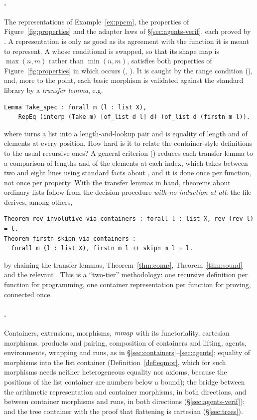 \documentclass{fundam}
\begin{document}
\paragraph{.}  The representations of Example~\ref{ex:ppcm}, the
properties of Figure~\ref{fig:properties} and the adapter laws of
\S\ref{sec:agents-verif}, each proved by .  A
representation is only as good as its agreement with the function it is meant to
represent.  A  whose conditional is swapped, so that its shape map is
$\max(n,m)$ rather than $\min(n,m)$, satisfies both properties of
Figure~\ref{fig:properties} in which  occurs (,
).  It is caught by the range condition
(), and, more to the point, each basic morphism is
validated against the standard library by a \emph{transfer lemma}, e.g.
\begin{lstlisting}
Lemma Take_spec : forall m (l : list X),
    RepEq (interp (Take m) [of_list d l] d) (of_list d (firstn m l)).
\end{lstlisting}
where  turns a list into a length-and-lookup pair and  is equality
of length and of elements at every position.  How hard is it to relate the container-style
definitions to the usual recursive ones?  A general criterion () reduces each
transfer lemma to a comparison of lengths and of the elements at each index, which takes
between two and eight lines using standard facts about , and it is done once per
function, not once per property.  With the transfer lemmas in hand, theorems about
ordinary lists follow from the decision procedure \emph{with no induction at all}: the
file derives, among others,
\begin{lstlisting}
Theorem rev_involutive_via_containers : forall l : list X, rev (rev l) = l.
Theorem firstn_skipn_via_containers :
  forall m (l : list X), firstn m l ++ skipn m l = l.
\end{lstlisting}
by chaining the transfer lemmas, Theorem~\ref{thm:comp}, Theorem~\ref{thm:sound} and the
relevant .  This is a ``two-tier'' methodology: one recursive definition per
function for programming, one container representation per function for proving,
connected once.

\paragraph{.}  Containers, extensions, morphisms, $\mathit{mmap}$ with its
functoriality, cartesian morphisms, products and pairing, composition of containers and
lifting, agents, environments, wrapping and runs, as in
\S\ref{sec:containers}--\ref{sec:agents}; equality of morphisms into the list container
(Definition~\ref{def:eqmor}, which for such morphisms needs neither heterogeneous
equality nor axioms, because the positions of the list container are numbers below a
bound); the bridge between the arithmetic representation and container morphisms, in
both directions, and between container morphisms and runs, in both directions
(\S\ref{sec:agents-verif}); and the tree container with the proof that flattening is
cartesian (\S\ref{sec:trees}).
\end{document}
